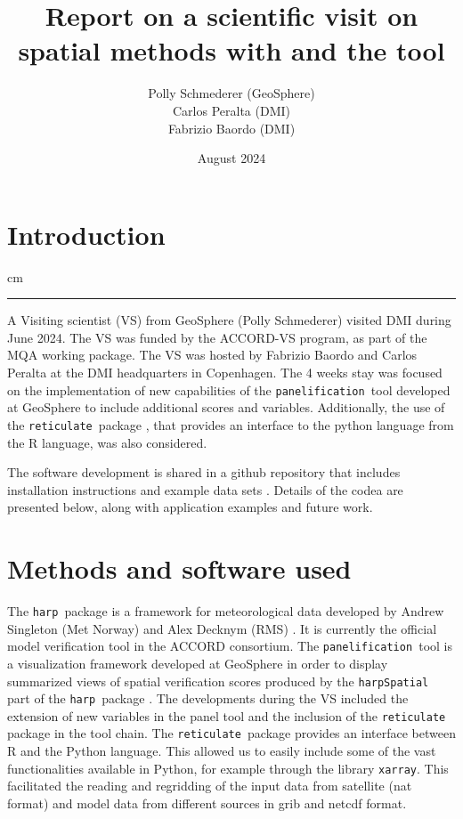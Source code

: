 \documentclass[11pt,a4paper]{article}
\date{}
\title{Report on a scientific visit on spatial methods with \harps and the \panels tool}
\author{Polly Schmederer (GeoSphere) \\ Carlos Peralta (DMI) \\ Fabrizio Baordo (DMI)}
\date{August 2024}
\newcommand{\retis}{\texttt{reticulate }}
\newcommand{\panels}{\texttt{panelification }}
\newcommand{\harps}{\texttt{harp }}
\newcommand{\harpss}{\texttt{harpSpatial }}
\newcommand {\sectionrule}{\vskip -0.9 cm
\color {mygray} \rule [0 cm] {17 cm}{0.1 mm} \color {black}}
\begin{document}
\maketitle
\thispagestyle{fancy}

\section{Introduction}
\sectionrule
A Visiting scientist (VS) from GeoSphere (Polly Schmederer) visited DMI during June 2024. The VS 
was funded by the ACCORD-VS program, as part of the MQA working package. The VS was hosted by Fabrizio Baordo
and Carlos Peralta at the DMI headquarters in Copenhagen. The 4 weeks stay was focused on the 
implementation  of new capabilities of the \panels tool \cite{panel_tool} developed at GeoSphere to include additional scores and variables. 
Additionally, the use of the \retis package \cite{reticulate}, that provides an interface to the python language from the R language, was also considered.

The software development is shared in a github repository that includes installation instructions and example data sets \cite{repo}.
Details of the codea are presented below, along with application examples and future work.


\section{Methods and software used}
The \harps package is a framework for meteorological data developed by Andrew Singleton (Met Norway) and Alex Decknym (RMS) \cite{harp}.
It is currently the official model verification tool in the ACCORD consortium.
The \panels tool is a visualization framework developed at GeoSphere in order to display summarized views of spatial verification scores
produced by the \harpss part of the \harps package \cite{panel_tool}.
The developments during the VS included the extension of new variables in the panel tool and the inclusion of the \retis package in the 
tool chain. 
The \retis package provides an interface between R and the Python language.
This allowed us to easily include some of the vast functionalities available
in Python, for example through the library \texttt{xarray}. This facilitated
the reading and regridding of the input data from satellite (nat format)
and model data from different sources in grib and netcdf format.
\end{document}
